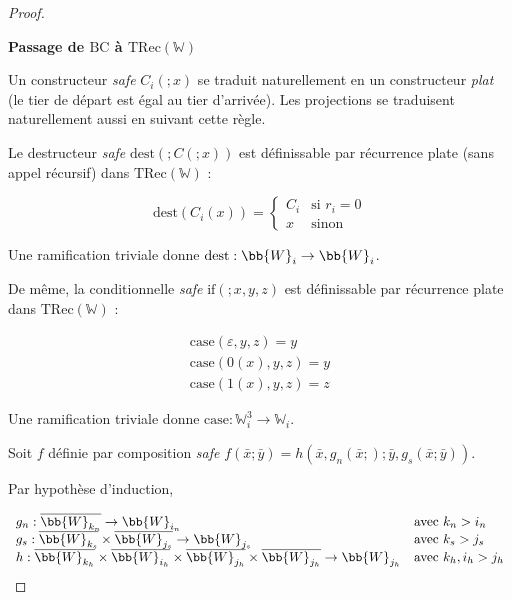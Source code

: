 \documentclass{report}
\newcommand{\TRec}[1]{\text{TRec}\left(\mathbb{#1}\right)}
\begin{document}
			\begin{proof}
				\textcolor{white}{T} %
				
				\textbf{Passage de $\text{BC}$ à $\TRec{W}$}
				
				Un constructeur \emph{safe} $C_i(; x)$ se traduit naturellement en un constructeur \emph{plat} (le tier de départ est égal au tier d'arrivée). Les projections se traduisent naturellement aussi en suivant cette règle.
				
				Le destructeur \emph{safe} $\text{dest} \left( ; C\left(; x\right) \right)$ est définissable par récurrence plate (sans appel récursif) dans $\TRec{W}$ : 
				
				\[
					\text{dest} \left( C_i\left( x\right) \right) = 
					\left\lbrace \begin{array}{ll}
					C_i	& \text{si $r_i = 0$} \\
					x	& \text{sinon}
					\end{array} \right.
				\]
				
				Une ramification triviale donne $\text{dest} : \bb{W}_i \to \bb{W}_i$.
				
				De même, la conditionnelle \emph{safe} $\text{if} \left( ; x, y, z\right)$ est définissable par récurrence plate dans $\TRec{W}$ : 
				
				\[
					\begin{array}{l}
					\text{case}(\varepsilon, y, z) = y \\
					\text{case}(0(x), y, z) = y \\
					\text{case}(1(x), y, z) = z
					\end{array}
				\]
				
				Une ramification triviale donne $\text{case} : \mathbb{W}_i^3 \to \mathbb{W}_i$.
				
				Soit $f$ définie par composition \emph{safe} $f\left( \bar{x} ; \bar{y}\right) = h\left( \bar{x}, g_n( \bar{x}; ) ; \bar{y}, g_s( \bar{x}; \bar{y} ) \right)$.
				
				Par hypothèse d'induction, 
				
				\[
					\begin{array}{ll}
					g_n : \overline{\bb{W}_{k_n}} \to \bb{W}_{i_n} & \text{avec $k_n > i_n$}\\
					g_s : \overline{\bb{W}_{k_s}} \times \overline{\bb{W}_{j_s}} \to \bb{W}_{j_s} & \text{avec $k_s > j_s$} \\
					h : \overline{\bb{W}_{k_h}} \times \overline{\bb{W}_{i_h}} \times \overline{\bb{W}_{j_h}} \times \overline{\bb{W}_{j_h}} \to \bb{W}_{j_h} & \text{avec $k_h, i_h > j_h$}
					\end{array}
				\]
				

\end{proof}
\end{document}
